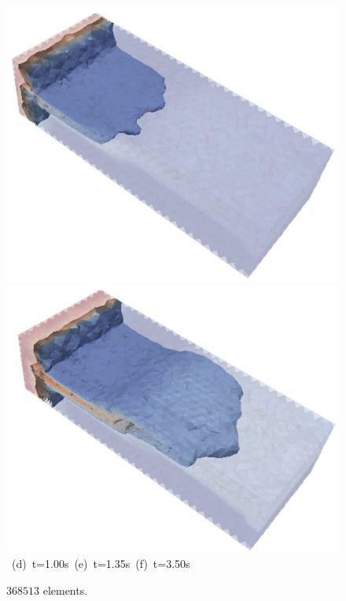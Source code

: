 \begin{landscape}
\begin{figure}[ht]
{{            \includegraphics[width=.45\textwidth]{./Pics1/3D_Channel/3D_Channel_Saturation1Isosurface_D150c.pdf}
            \includegraphics[width=.45\textwidth]{./Pics1/3D_Channel/3D_Channel_Saturation1Isosurface_D400c.pdf} }
      \hbox{\hspace{3.cm} (d) t=1.00s \hspace{3.cm} (e) t=1.35s\hspace{4.cm} (f) t=3.50s }}
\caption{$368513$ elements.}
\label{fig:3DChannel_Isosurf}
\end{figure}
\end{landscape}
\clearpage

